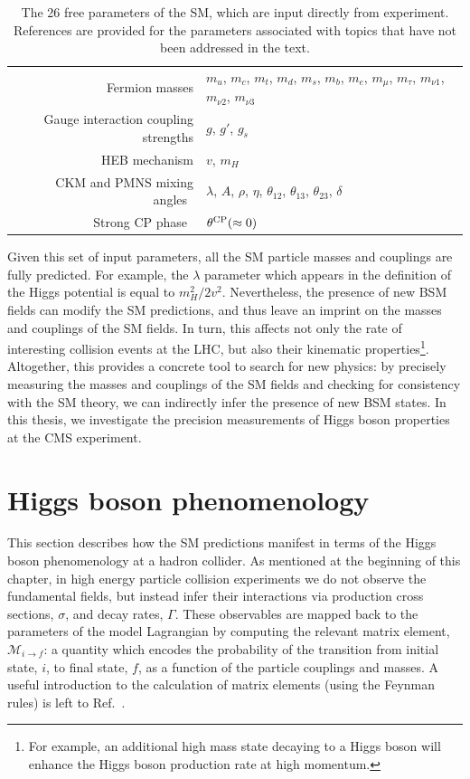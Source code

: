 \begin{table}[htb]
    \caption[The free parameters of the SM]{The 26 free parameters of the SM, which are input directly from experiment. References are provided for the parameters associated with topics that have not been addressed in the text.}
    \label{tab:sm_freeparams}
    \centering
    \footnotesize
    \renewcommand{\arraystretch}{2}
    \begin{tabular}{r|l}
       Fermion masses & $m_u$, $m_c$, $m_t$, $m_d$, $m_s$, $m_b$, $m_e$, $m_\mu$, $m_\tau$, $m_{{\nu}1}$, $m_{{\nu}2}$, $m_{{\nu}3}$ \\
       Gauge interaction coupling strengths & $g$, $g'$, $g_s$ \\
       HEB mechanism & $v$, $m_H$ \\
       CKM and PMNS mixing angles~\cite{Cabibbo:1963yz,Kobayashi:1973fv,Pontecorvo:1957qd,Maki:1962mu} & $\lambda$, $A$, $\rho$, $\eta$, $\theta_{12}$, $\theta_{13}$, $\theta_{23}$, $\delta$  \\
       Strong CP phase~\cite{strongcp} & $\theta^{\rm{CP}}(\approx0)$\\
    \end{tabular}
\end{table}

Given this set of input parameters, all the SM particle masses and couplings are fully predicted. For example, the $\lambda$ parameter which appears in the definition of the Higgs potential is equal to $m_H^2/2v^2$. Nevertheless, the presence of new BSM fields can modify the SM predictions, and thus leave an imprint on the masses and couplings of the SM fields. In turn, this affects not only the rate of interesting collision events at the LHC, but also their kinematic properties\footnote{For example, an additional high mass state decaying to a Higgs boson will enhance the Higgs boson production rate at high momentum.}. Altogether, this provides a concrete tool to search for new physics: by precisely measuring the masses and couplings of the SM fields and checking for consistency with the SM theory, we can indirectly infer the presence of new BSM states. In this thesis, we investigate the precision measurements of Higgs boson properties at the CMS experiment.

\section{Higgs boson phenomenology}
This section describes how the SM predictions manifest in terms of the Higgs boson phenomenology at a hadron collider. As mentioned at the beginning of this chapter, in high energy particle collision experiments we do not observe the fundamental fields, but instead infer their interactions via production cross sections, $\sigma$, and decay rates, $\Gamma$. These observables are mapped back to the parameters of the model Lagrangian by computing the relevant matrix element, $\mathcal{M}_{i \rightarrow f}$: a quantity which encodes the probability of the transition from initial state, $i$, to final state, $f$, as a function of the particle couplings and masses. A useful introduction to the calculation of matrix elements (using the Feynman rules) is left to Ref.~\cite{Thomson:2013zua}. 

